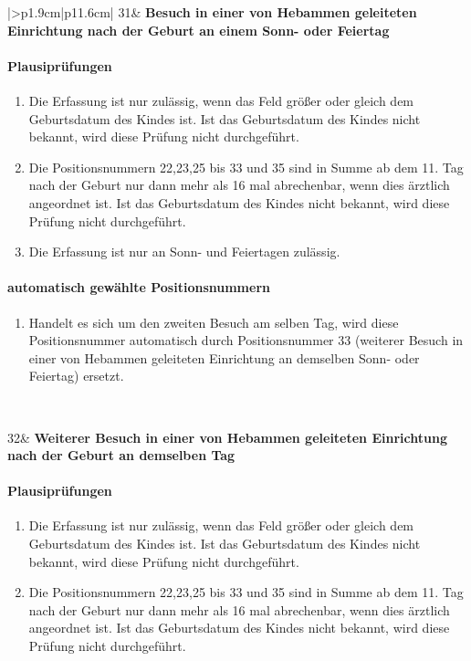 \begin{mpsupertabular}{|>{\centering}p{1.9cm}|p{11.6cm}|}
31&
\textbf{Besuch in einer von Hebammen geleiteten Einrichtung
nach der Geburt an einem Sonn- oder Feiertag}
\paragraph{Plausiprüfungen}
\begin{enumerate}
\item
Die Erfassung ist nur zulässig, wenn das Feld  größer 
oder gleich dem Geburtsdatum des Kindes ist. Ist das Geburtsdatum des
Kindes nicht bekannt, wird diese Prüfung nicht durchgeführt.
\item
Die Positionsnummern 22,23,25 bis 33 und 35 sind in Summe ab dem 11. Tag 
nach der Geburt nur dann mehr 
als 16 mal abrechenbar, wenn dies ärztlich angeordnet ist.
 Ist das Geburtsdatum des
Kindes nicht bekannt, wird diese Prüfung nicht durchgeführt.
\item
Die Erfassung ist nur an Sonn- und Feiertagen zulässig.
\end{enumerate}
\paragraph{automatisch gewählte Positionsnummern}
\begin{enumerate}
\item
Handelt es sich um den zweiten Besuch am selben Tag, wird diese 
Positionsnummer automatisch durch Positionsnummer 33
(weiterer Besuch in einer von Hebammen geleiteten Einrichtung
 an demselben Sonn- oder Feiertag)
ersetzt.
\end{enumerate}
\\ \hline


32&
\textbf{Weiterer Besuch in einer von Hebammen geleiteten Einrichtung
nach der Geburt an demselben Tag}
\paragraph{Plausiprüfungen}
\begin{enumerate}
\item
Die Erfassung ist nur zulässig, wenn das Feld  größer 
oder gleich dem Geburtsdatum des Kindes ist. Ist das Geburtsdatum des
Kindes nicht bekannt, wird diese Prüfung nicht durchgeführt.
\item
Die Positionsnummern 22,23,25 bis 33 und 35 sind in Summe ab dem 11. Tag 
nach der Geburt nur dann mehr 
als 16 mal abrechenbar, wenn dies ärztlich angeordnet ist.
 Ist das Geburtsdatum des
Kindes nicht bekannt, wird diese Prüfung nicht durchgeführt.
\end{enumerate}

\end{mpsupertabular}
